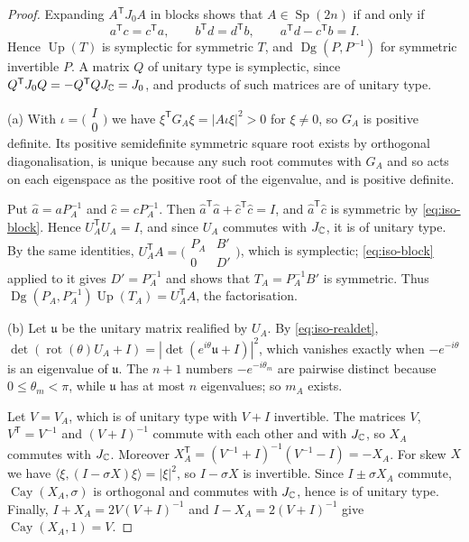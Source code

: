 \begin{proof}
Expanding $A^{\mathsf T}J_0A$ in blocks shows that $A\in\operatorname{Sp}(2n)$ if and only if
\begin{equation}\label{eq:iso-block}
 a^{\mathsf T}c=c^{\mathsf T}a,\qquad b^{\mathsf T}d=d^{\mathsf T}b,\qquad a^{\mathsf T}d-c^{\mathsf T}b=I .
\end{equation}
Hence $\operatorname{Up}(T)$ is symplectic for symmetric $T$, and $\operatorname{Dg}(P,P^{-1})$ for symmetric invertible $P$. A matrix $Q$ of unitary type is symplectic, since $Q^{\mathsf T}J_0Q=-Q^{\mathsf T}QJ_{\mathbb{C}}=J_0$, and products of such matrices are of unitary type.

(a) With $\iota=\bigl(\begin{smallmatrix}I\\0\end{smallmatrix}\bigr)$ we have $\xi^{\mathsf T}G_A\xi=|A\iota\xi|^2>0$ for $\xi\ne0$, so $G_A$ is positive definite. Its positive semidefinite symmetric square root exists by orthogonal diagonalisation, is unique because any such root commutes with $G_A$ and so acts on each eigenspace as the positive root of the eigenvalue, and is positive definite.

Put $\hat a=aP_A^{-1}$ and $\hat c=cP_A^{-1}$. Then $\hat a^{\mathsf T}\hat a+\hat c^{\mathsf T}\hat c=I$, and $\hat a^{\mathsf T}\hat c$ is symmetric by \eqref{eq:iso-block}. Hence $U_A^{\mathsf T}U_A=I$, and since $U_A$ commutes with $J_{\mathbb{C}}$, it is of unitary type. By the same identities, $U_A^{\mathsf T}A=\bigl(\begin{smallmatrix}P_A&B'\\0&D'\end{smallmatrix}\bigr)$, which is symplectic; \eqref{eq:iso-block} applied to it gives $D'=P_A^{-1}$ and shows that $T_A=P_A^{-1}B'$ is symmetric. Thus $\operatorname{Dg}(P_A,P_A^{-1})\operatorname{Up}(T_A)=U_A^{\mathsf T}A$, the factorisation.

(b) Let $\mathfrak u$ be the unitary matrix realified by $U_A$. By \eqref{eq:iso-realdet}, $\det(\operatorname{rot}(\theta)U_A+I)=|\det(e^{i\theta}\mathfrak u+I)|^2$, which vanishes exactly when $-e^{-i\theta}$ is an eigenvalue of $\mathfrak u$. The $n+1$ numbers $-e^{-i\theta_m}$ are pairwise distinct because $0\le\theta_m<\pi$, while $\mathfrak u$ has at most $n$ eigenvalues; so $m_A$ exists.

Let $V=V_A$, which is of unitary type with $V+I$ invertible. The matrices $V$, $V^{\mathsf T}=V^{-1}$ and $(V+I)^{-1}$ commute with each other and with $J_{\mathbb{C}}$, so $X_A$ commutes with $J_{\mathbb{C}}$. Moreover $X_A^{\mathsf T}=(V^{-1}+I)^{-1}(V^{-1}-I)=-X_A$. For skew $X$ we have $\langle\xi,(I-\sigma X)\xi\rangle=|\xi|^2$, so $I-\sigma X$ is invertible. Since $I\pm\sigma X_A$ commute, $\operatorname{Cay}(X_A,\sigma)$ is orthogonal and commutes with $J_{\mathbb{C}}$, hence is of unitary type. Finally, $I+X_A=2V(V+I)^{-1}$ and $I-X_A=2(V+I)^{-1}$ give $\operatorname{Cay}(X_A,1)=V$.


\end{proof}
